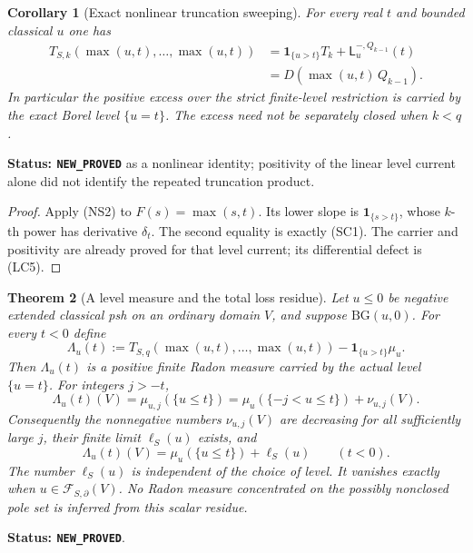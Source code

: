\documentclass[11pt,a4paper]{article}
\numberwithin{equation}{section}
\newtheorem{theorem}{Theorem}[section]
\newtheorem{corollary}[theorem]{Corollary}
\theoremstyle{definition}
\theoremstyle{remark}
\begin{document}
\begin{corollary}[Exact nonlinear truncation sweeping]
\label{cor:r11-exact-truncation-sweeping}
For every real $t$ and bounded classical $u$ one has
\[
 \begin{split}
 T_{S,k}(\max(u,t),\ldots,\max(u,t))
   &=\mathbf1_{\{u>t\}}T_k+
                           \mathsf L_u^{-,Q_{k-1}}(t)\\
   &=D(\max(u,t)\,Q_{k-1}).
 \end{split}
 \tag{NS4}
\]
In particular the positive excess over the strict finite-level
restriction is carried by the exact Borel level $\{u=t\}$.
The excess need not be separately closed when $k<q$.
\end{corollary}

\noindent\textbf{Status: \texttt{NEW\_PROVED}} as a nonlinear
identity; positivity of the linear level current alone did not
identify the repeated truncation product.

\begin{proof}
Apply (NS2) to $F(s)=\max(s,t)$. Its lower slope is
$\mathbf1_{\{s>t\}}$, whose $k$-th power has derivative
$\delta_t$. The second equality is exactly (SC1).
The carrier and positivity are already proved for that level
current; its differential defect is (LC5).
\end{proof}

\begin{theorem}[A level measure and the total loss residue]
\label{thm:r11-level-loss-residue}
Let $u\leq0$ be negative extended classical psh on an ordinary
domain $V$, and suppose $\mathrm{BG}(u,0)$.
For every $t<0$ define
\[
 \Lambda_u(t)
    :=T_{S,q}(\max(u,t),\ldots,\max(u,t))
                                  -\mathbf1_{\{u>t\}}\mu_u.
 \tag{NS5}
\]
Then $\Lambda_u(t)$ is a positive finite Radon measure carried
by the actual level $\{u=t\}$. For integers $j>-t$,
\[
 \Lambda_u(t)(V)
    =\mu_{u,j}(\{u\leq t\})
    =\mu_u(\{-j<u\leq t\})+\nu_{u,j}(V).
 \tag{NS6}
\]
Consequently the nonnegative numbers $\nu_{u,j}(V)$ are
decreasing for all sufficiently large $j$, their finite limit
$\ell_S(u)$ exists, and
\[
 \Lambda_u(t)(V)=\mu_u(\{u\leq t\})+\ell_S(u)
                         \qquad(t<0).
 \tag{NS7}
\]
The number $\ell_S(u)$ is independent of the choice of level.
It vanishes exactly when $u\in\mathcal F_{S,\partial}(V)$.
No Radon measure concentrated on the possibly nonclosed pole
set is inferred from this scalar residue.
\end{theorem}

\noindent\textbf{Status: \texttt{NEW\_PROVED}}.
\end{document}
